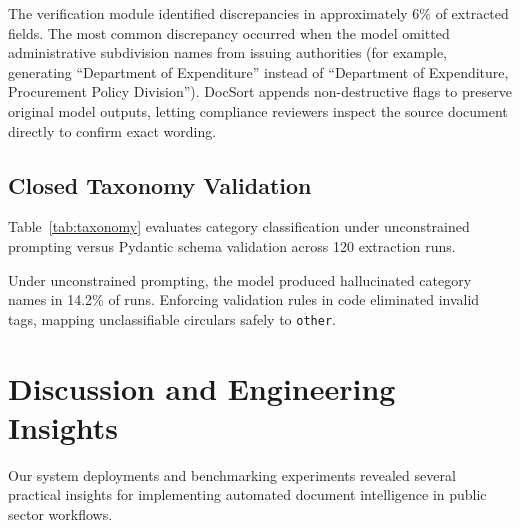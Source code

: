 \documentclass{article}
\begin{document}
The verification module identified discrepancies in approximately 6\% of extracted fields. The most common discrepancy occurred when the model omitted administrative subdivision names from issuing authorities (for example, generating ``Department of Expenditure'' instead of ``Department of Expenditure, Procurement Policy Division''). DocSort appends non-destructive flags to preserve original model outputs, letting compliance reviewers inspect the source document directly to confirm exact wording.

\subsection{Closed Taxonomy Validation}
Table~\ref{tab:taxonomy} evaluates category classification under unconstrained prompting versus Pydantic schema validation across 120 extraction runs.

\begin{table}[t]
\centering
{}
\caption{Category taxonomy compliance across 120 extraction runs.}
\label{tab:taxonomy}
\end{table}

Under unconstrained prompting, the model produced hallucinated category names in 14.2\% of runs. Enforcing validation rules in code eliminated invalid tags, mapping unclassifiable circulars safely to \texttt{other}.

\section{Discussion and Engineering Insights}

Our system deployments and benchmarking experiments revealed several practical insights for implementing automated document intelligence in public sector workflows.
\end{document}
